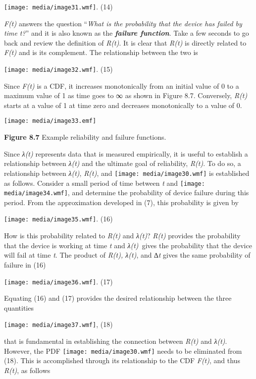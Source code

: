 \texttt{[image: media/image31.wmf]}. (14)

\emph{F(t)} answers the question ``\emph{What is the probability that
the device has failed by time t?}'' and it is also known as the
\emph{\textbf{failure function}}. Take a few seconds to go back and
review the definition of \emph{R(t)}. It is clear that \emph{R(t)} is
directly related to \emph{F(t)} and is its complement. The relationship
between the two is

\texttt{[image: media/image32.wmf]}. (15)

Since \emph{F(t)} is a CDF, it increases monotonically from an initial
value of 0 to a maximum value of 1 as time goes to ∞ as shown in Figure
8.7. Conversely, \emph{R(t)} starts at a value of 1 at time zero and
decreases monotonically to a value of 0.

\texttt{[image: media/image33.emf]}

\textbf{Figure 8.7} Example reliability and failure functions.

Since \emph{λ(t)} represents data that is measured empirically, it is
useful to establish a relationship between \emph{λ(t)} and the ultimate
goal of reliability, \emph{R(t)}. To do so, a relationship between
\emph{λ(t)}, \emph{R(t)}, and \texttt{[image: media/image30.wmf]} is
established as follows. Consider a small period of time between \emph{t}
and \texttt{[image: media/image34.wmf]}, and determine the probability
of device failure during this period. From the approximation developed
in (7), this probability is given by

\texttt{[image: media/image35.wmf]}. (16)

How is this probability related to \emph{R(t)} and \emph{λ(t)}?
\emph{R(t)} provides the probability that the device is working at time
\emph{t} and \emph{λ(t)~}gives the probability that the device will fail
at time \emph{t}. The product of \emph{R(t), λ(t)}, and ∆\emph{t} gives
the same probability of failure in (16)

\texttt{[image: media/image36.wmf]}. (17)

Equating (16) and (17) provides the desired relationship between the
three quantities

\texttt{[image: media/image37.wmf]}, (18)

that is fundamental in establishing the connection between \emph{R(t)}
and \emph{λ(t)}. However, the PDF \texttt{[image: media/image30.wmf]}
needs to be eliminated from (18). This is accomplished through its
relationship to the CDF \emph{F(t)}, and thus \emph{R(t)}, as follows

